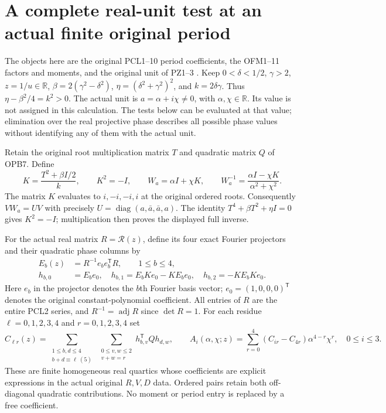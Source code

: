 \section{A complete real-unit test at an actual finite original period}
The objects here are the original PCL1--10 period coefficients,
the OFM1--11 factors and moments, and the original unit of PZ1--3
\cite{PCLOriginal,NC,Cumulative,PeriodZeroOriginal}.
Keep $0<\delta<1/2$, $\gamma>2$, $z=1/u\in\mathbb R$,
$\beta=2(\gamma^2-\delta^2)$, $\eta=(\delta^2+\gamma^2)^2$,
and $k=2\delta\gamma$. Thus
$\eta-\beta^2/4=k^2>0$. The actual unit is
$a=\alpha+i\chi\ne0$, with $\alpha,\chi\in\mathbb R$.
Its value is not assigned in this calculation. The tests below can be
evaluated at that value; elimination over the real projective phase
describes all possible phase values without identifying any of them
with the actual unit.

Retain the original root multiplication matrix $T$ and quadratic matrix
$Q$ of OPB7. Define
\[
 K=\frac{T^2+\beta I/2}{k},\qquad
 K^2=-I,\qquad
 W_a=\alpha I+\chi K,\qquad
 W_a^{-1}=\frac{\alpha I-\chi K}{\alpha^2+\chi^2}.
 \tag{FUT1}
\]
The matrix $K$ evaluates to $i,-i,-i,i$ at the original ordered roots.
Consequently $VW_a=UV$ with precisely
$U=\operatorname{diag}(a,\bar a,\bar a,a)$.
The identity $T^4+\beta T^2+\eta I=0$ gives $K^2=-I$;
multiplication then proves the displayed full inverse.

For the actual real matrix $R=\mathcal R(z)$, define its four exact
Fourier projectors and their quadratic phase columns by
\[
 \begin{split}
 E_b(z)&=R^{-1}e_be_b^{\mathsf T}R,\qquad 1\le b\le4,\\
 h_{b,0}&=E_be_0,\quad
 h_{b,1}=E_bKe_0-KE_be_0,\quad
 h_{b,2}=-KE_bKe_0.
 \end{split}\tag{FUT2}
\]
Here $e_b$ in the projector denotes the $b$th Fourier basis vector;
$e_0=(1,0,0,0)^{\mathsf T}$ denotes the original constant-polynomial
coefficient. All entries of $R$ are the entire PCL2 series, and
$R^{-1}=\operatorname{adj}R$ since $\det R=1$.
For each residue $\ell=0,1,2,3,4$ and $r=0,1,2,3,4$ set
\[
 C_{\ell r}(z)=
 \sum_{\substack{1\le b,d\le4\\b+d\equiv\ell\ (5)}}
 \ \sum_{\substack{0\le v,w\le2\\v+w=r}}
       h_{b,v}^{\mathsf T}Qh_{d,w},\qquad
 A_i(\alpha,\chi;z)=
 \sum_{r=0}^4(C_{ir}-C_{4r})\alpha^{4-r}\chi^r,
 \quad 0\le i\le3.
 \tag{FUT3}
\]
These are finite homogeneous real quartics whose coefficients are
explicit expressions in the actual original $R,V,D$ data. Ordered
pairs retain both off-diagonal quadratic contributions.
No moment or period entry is replaced by a free coefficient.

